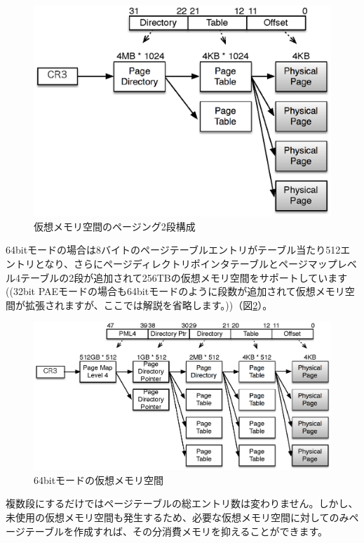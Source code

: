 \documentclass[a4j,12pt]{jarticle}
\begin{document}
\begin{figure}
\includegraphics{figures/part2_fig4.eps}
\caption{仮想メモリ空間のページング2段構成}
\label{fig4}
\end{figure}

64bitモードの場合は8バイトのページテーブルエントリがテーブル当たり512エントリとなり、さらにページディレクトリポインタテーブルとページマップレベル4テーブルの2段が追加されて256TBの仮想メモリ空間をサポートしています((32bit PAEモードの場合も64bitモードのように段数が追加されて仮想メモリ空間が拡張されますが、ここでは解説を省略します。))（図\ref{fig5}）。

\begin{figure}
\includegraphics{figures/part2_fig5.eps}
\caption{64bitモードの仮想メモリ空間}
\label{fig5}
\end{figure}

複数段にするだけではページテーブルの総エントリ数は変わりません。しかし、未使用の仮想メモリ空間も発生するため、必要な仮想メモリ空間に対してのみページテーブルを作成すれば、その分消費メモリを抑えることができます。
\end{document}
